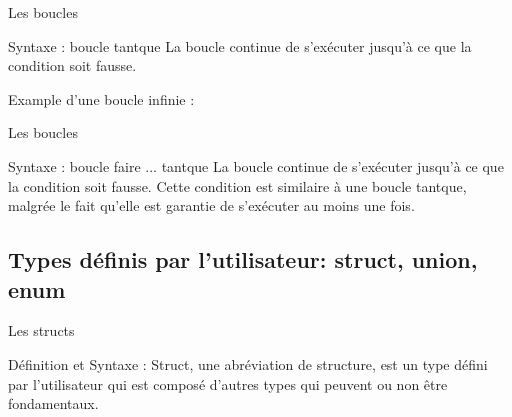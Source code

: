 \documentclass{beamer}
\begin{document}
\begin{darkframes}


	\begin{frame}{Les boucles}
		\begin{block}{Syntaxe : boucle tantque}
			\WhileSyntax
			La boucle continue de s'exécuter jusqu'à ce que la condition soit \alert{fausse}.
		\end{block}
		\begin{exampleblock}{Example d'une boucle infinie :}
			\WhileInfinite
		\end{exampleblock}
	\end{frame}

	\begin{frame}{Les boucles}
		\begin{block}{Syntaxe : boucle faire ... tantque}
			\doWhileSyntax
			La boucle continue de s'exécuter jusqu'à ce que la condition soit \alert{fausse}. 
			Cette condition est similaire à une boucle tantque, malgrée le fait qu'elle est garantie de s'exécuter au moins une fois.
		\end{block}
	\end{frame}
	


  	\subsection{Types définis par l'utilisateur: struct, union, enum}
  	\begin{frame}{Les structs}
  		\begin{block}{Définition et Syntaxe :}
  			Struct, une abréviation de structure, est un type défini par l'utilisateur qui est composé d'autres types qui peuvent ou non être fondamentaux.
  			\structSyntax
  		\end{block}
  	\end{frame}
  

\end{darkframes}
\end{document}
